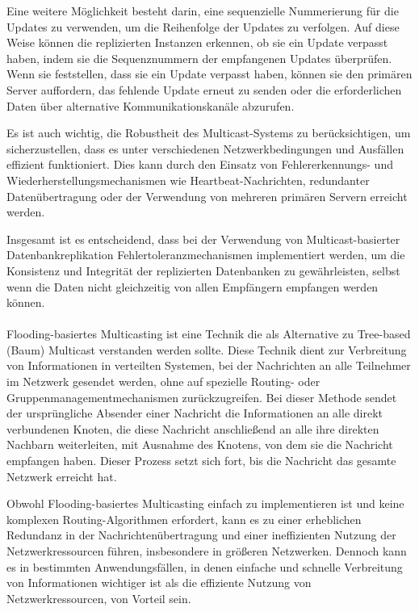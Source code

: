 Eine weitere Möglichkeit besteht darin, eine sequenzielle Nummerierung für die Updates zu verwenden, um die Reihenfolge der Updates zu verfolgen. Auf diese Weise können die replizierten Instanzen erkennen, ob sie ein Update verpasst haben, indem sie die Sequenznummern der empfangenen Updates überprüfen. Wenn sie feststellen, dass sie ein Update verpasst haben, können sie den primären Server auffordern, das fehlende Update erneut zu senden oder die erforderlichen Daten über alternative Kommunikationskanäle abzurufen.

Es ist auch wichtig, die Robustheit des Multicast-Systems zu berücksichtigen, um sicherzustellen, dass es unter verschiedenen Netzwerkbedingungen und Ausfällen effizient funktioniert. Dies kann durch den Einsatz von Fehlererkennungs- und Wiederherstellungsmechanismen wie Heartbeat-Nachrichten, redundanter Datenübertragung oder der Verwendung von mehreren primären Servern erreicht werden.

Insgesamt ist es entscheidend, dass bei der Verwendung von Multicast-basierter Datenbankreplikation Fehlertoleranzmechanismen implementiert werden, um die Konsistenz und Integrität der replizierten Datenbanken zu gewährleisten, selbst wenn die Daten nicht gleichzeitig von allen Empfängern empfangen werden können.
\\\\
Flooding-basiertes Multicasting ist eine Technik die als Alternative zu Tree-based (Baum) Multicast verstanden werden sollte. Diese Technik dient zur Verbreitung von Informationen in verteilten Systemen, bei der Nachrichten an alle Teilnehmer im Netzwerk gesendet werden, ohne auf spezielle Routing- oder Gruppenmanagementmechanismen zurückzugreifen. Bei dieser Methode sendet der ursprüngliche Absender einer Nachricht die Informationen an alle direkt verbundenen Knoten, die diese Nachricht anschließend an alle ihre direkten Nachbarn weiterleiten, mit Ausnahme des Knotens, von dem sie die Nachricht empfangen haben. Dieser Prozess setzt sich fort, bis die Nachricht das gesamte Netzwerk erreicht hat.

Obwohl Flooding-basiertes Multicasting einfach zu implementieren ist und keine komplexen Routing-Algorithmen erfordert, kann es zu einer erheblichen Redundanz in der Nachrichtenübertragung und einer ineffizienten Nutzung der Netzwerkressourcen führen, insbesondere in größeren Netzwerken. Dennoch kann es in bestimmten Anwendungsfällen, in denen einfache und schnelle Verbreitung von Informationen wichtiger ist als die effiziente Nutzung von Netzwerkressourcen, von Vorteil sein.

